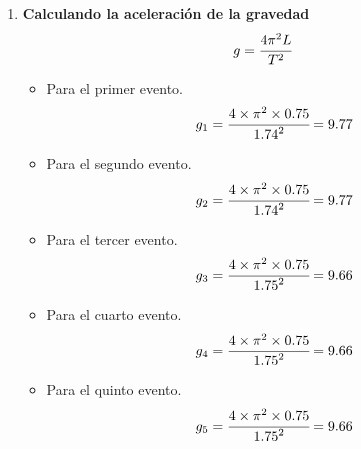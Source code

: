 \begin{enumerate}[label=\bfseries\alph*.-,itemsep=2pt]
	\item \textbf{Calculando la aceleración de la gravedad}
	      \[g= \cfrac{4\pi^2L}{T^2}\]
	      \begin{itemize}[label=\textbf{$\bullet$},itemsep=2pt,partopsep=6pt,parsep=6pt]
		      \item Para el primer evento.
		            \[g_1= \cfrac{4\times\pi^2\times{0.75}}{{1.74}^2}=9.77\]
		      \item Para el segundo evento.
		            \[g_2= \cfrac{4\times\pi^2\times{0.75}}{{1.74}^2}=9.77\]
		      \item Para el tercer evento.
		            \[g_3= \cfrac{4\times\pi^2\times{0.75}}{{1.75}^2}=9.66\]
		      \item Para el cuarto evento.
		            \[g_4= \cfrac{4\times\pi^2\times{0.75}}{{1.75}^2}=9.66\]
		      \item Para el quinto evento.
		            \[g_5= \cfrac{4\times\pi^2\times{0.75}}{{1.75}^2}=9.66\]
	      \end{itemize}
\end{enumerate}

